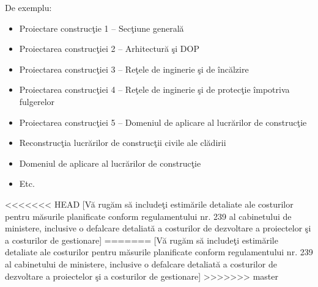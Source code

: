         De exemplu:
        \begin{itemize}
		\item Proiectare construcţie  1 – Secţiune generală
		\item Proiectarea construcţiei  2 – Arhitectură şi DOP
		\item Proiectarea construcţiei  3 –  Reţele de inginerie şi de încălzire
		\item Proiectarea construcţiei  4 – Reţele de inginerie şi de protecţie împotriva fulgerelor
		\item Proiectarea construcţiei  5 – Domeniul de aplicare al lucrărilor de construcţie
		\item Reconstrucţia lucrărilor de construcţii civile ale clădirii
		\item Domeniul de aplicare al lucrărilor de construcţie
		\item Etc.
	\end{itemize}

<<<<<<< HEAD
[Vă rugăm să includeţi estimările detaliate ale costurilor pentru măsurile planificate conform regulamentului nr. 239 al cabinetului de ministere, inclusive o defalcare detaliată a costurilor de dezvoltare a proiectelor şi a costurilor de gestionare]
=======
[Vă rugăm să includeţi estimările detaliate ale costurilor pentru măsurile planificate conform regulamentului nr. 239 al cabinetului de ministere, inclusive o defalcare detaliată a costurilor de dezvoltare a proiectelor şi a costurilor de gestionare]
>>>>>>> master
